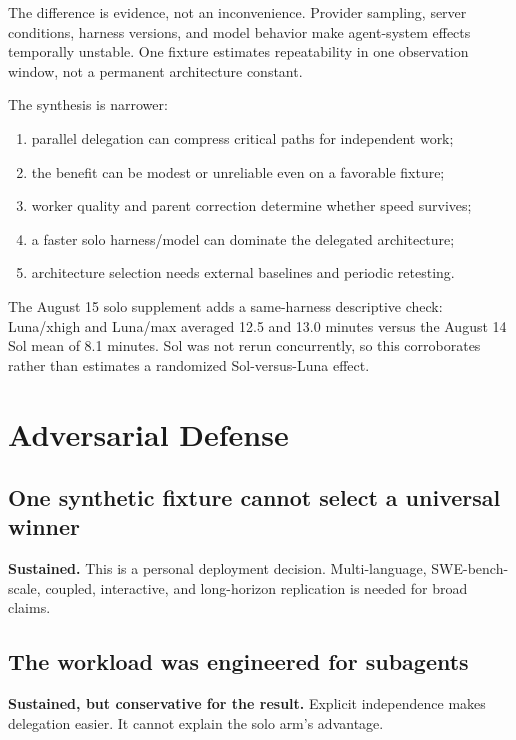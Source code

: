 \documentclass[11pt,oneside]{article}
\begin{document}
The difference is evidence, not an inconvenience. Provider sampling, server
conditions, harness versions, and model behavior make agent-system effects
temporally unstable. One fixture estimates repeatability in one observation
window, not a permanent architecture constant.

The synthesis is narrower:

\begin{enumerate}
  \item parallel delegation can compress critical paths for independent work;
  \item the benefit can be modest or unreliable even on a favorable fixture;
  \item worker quality and parent correction determine whether speed survives;
  \item a faster solo harness/model can dominate the delegated architecture;
  \item architecture selection needs external baselines and periodic retesting.
\end{enumerate}

The August 15 solo supplement adds a same-harness descriptive check: Luna/xhigh
and Luna/max averaged 12.5 and 13.0 minutes versus the August 14 Sol mean of 8.1
minutes. Sol was not rerun concurrently, so this corroborates rather than
estimates a randomized Sol-versus-Luna effect.

\section{Adversarial Defense}

\subsection{One synthetic fixture cannot select a universal winner}

\textbf{Sustained.} This is a personal deployment decision. Multi-language,
SWE-bench-scale, coupled, interactive, and long-horizon replication is needed
for broad claims.

\subsection{The workload was engineered for subagents}

\textbf{Sustained, but conservative for the result.} Explicit independence
makes delegation easier. It cannot explain the solo arm's advantage.
\end{document}
